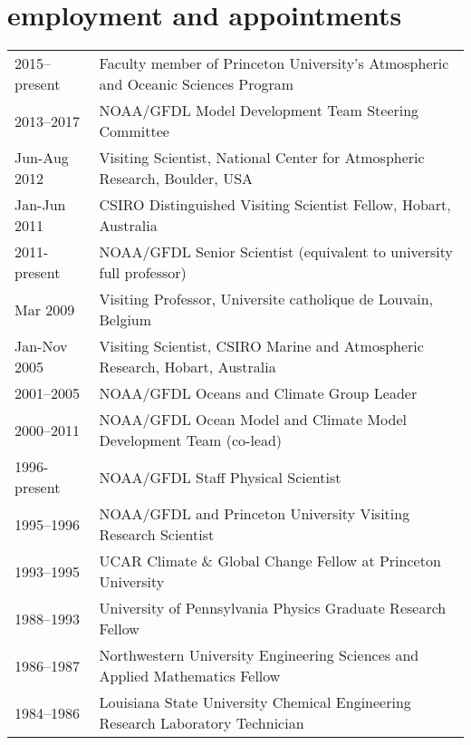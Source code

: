 \documentclass{article}
\begin{document}
\section*{\sc \color{Maroon}   employment and appointments} 
\vspace{-.25cm}
\begin{tabular}{ll}


2015--present & Faculty member of Princeton University's Atmospheric and Oceanic Sciences Program
  \\
  2013--2017  & NOAA/GFDL Model Development Team Steering Committee  \\
  Jun-Aug 2012  & Visiting Scientist, National Center for Atmospheric
                  Research, Boulder, USA \\
  Jan-Jun 2011   & CSIRO Distinguished Visiting Scientist Fellow, Hobart, Australia \\
  2011-present & NOAA/GFDL Senior Scientist (equivalent to university full professor) \\ 
  Mar 2009         & Visiting Professor, Universite catholique de Louvain, Belgium \\
  Jan-Nov 2005   & Visiting Scientist, CSIRO Marine and Atmospheric  Research, Hobart, Australia \\
  2001--2005     & NOAA/GFDL Oceans and Climate Group Leader \\
  2000--2011     & NOAA/GFDL Ocean Model and Climate Model Development Team (co-lead) \\
  1996-present   &  NOAA/GFDL Staff Physical Scientist \\  
  1995--1996     &  NOAA/GFDL and Princeton University Visiting Research Scientist  \\ 
  1993--1995     & UCAR Climate \& Global Change Fellow at Princeton University \\
  1988--1993     &  University of Pennsylvania Physics Graduate Research Fellow  \\                     
  1986--1987     &  Northwestern University Engineering Sciences and Applied Mathematics Fellow \\
  1984--1986     &  Louisiana State University Chemical Engineering Research Laboratory Technician                     
\end{tabular}
\end{document}
